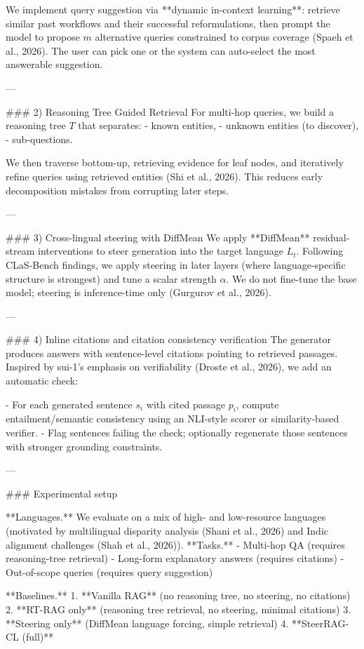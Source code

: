 We implement query suggestion via **dynamic in-context learning**: retrieve similar past workflows and their successful reformulations, then prompt the model to propose \(m\) alternative queries constrained to corpus coverage (Spaeh et al., 2026). The user can pick one or the system can auto-select the most answerable suggestion.

---

### 2) Reasoning Tree Guided Retrieval
For multi-hop queries, we build a reasoning tree \(T\) that separates:
- known entities,
- unknown entities (to discover),
- sub-questions.

We then traverse bottom-up, retrieving evidence for leaf nodes, and iteratively refine queries using retrieved entities (Shi et al., 2026). This reduces early decomposition mistakes from corrupting later steps.

---

### 3) Cross-lingual steering with DiffMean
We apply **DiffMean** residual-stream interventions to steer generation into the target language \(L_t\). Following CLaS-Bench findings, we apply steering in later layers (where language-specific structure is strongest) and tune a scalar strength \(\alpha\). We do not fine-tune the base model; steering is inference-time only (Gurgurov et al., 2026).

---

### 4) Inline citations and citation consistency verification
The generator produces answers with sentence-level citations pointing to retrieved passages. Inspired by sui-1’s emphasis on verifiability (Droste et al., 2026), we add an automatic check:

- For each generated sentence \(s_i\) with cited passage \(p_i\), compute entailment/semantic consistency using an NLI-style scorer or similarity-based verifier.
- Flag sentences failing the check; optionally regenerate those sentences with stronger grounding constraints.

---

### Experimental setup

**Languages.** We evaluate on a mix of high- and low-resource languages (motivated by multilingual disparity analysis (Shani et al., 2026) and Indic alignment challenges (Shah et al., 2026)).  
**Tasks.**
- Multi-hop QA (requires reasoning-tree retrieval)
- Long-form explanatory answers (requires citations)
- Out-of-scope queries (requires query suggestion)

**Baselines.**
1. **Vanilla RAG** (no reasoning tree, no steering, no citations)
2. **RT-RAG only** (reasoning tree retrieval, no steering, minimal citations)
3. **Steering only** (DiffMean language forcing, simple retrieval)
4. **SteerRAG-CL (full)**

